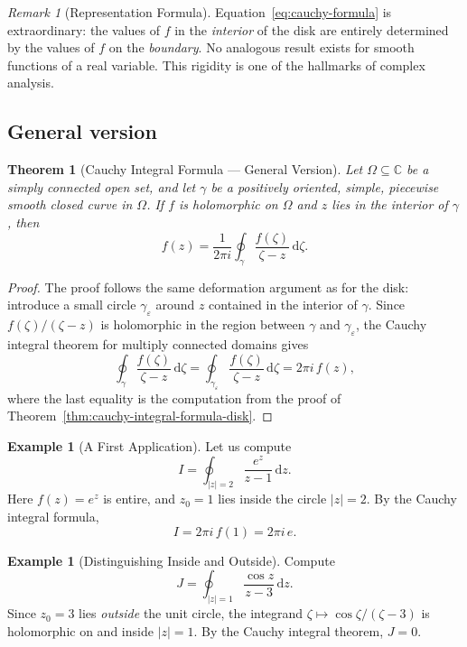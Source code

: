 \documentclass[12pt,a4paper,openany]{book}
\theoremstyle{definition}
\newtheorem{example}[definition]{Example}
\theoremstyle{plain}
\newtheorem{theorem}[definition]{Theorem}
\theoremstyle{remark}
\newtheorem{remark}[definition]{Remark}
\newcommand{\C}{\mathbb{C}}
\newcommand{\dd}{\mathrm{d}}
\newcommand{\abs}[1]{\left|#1\right|}
\begin{document}
\begin{remark}[Representation Formula]\label{rem:representation}
Equation~\eqref{eq:cauchy-formula} is extraordinary: the values of $f$ in the
\emph{interior} of the disk are entirely determined by the values of $f$ on
the \emph{boundary}. No analogous result exists for smooth functions of a real
variable. This rigidity is one of the hallmarks of complex analysis.
\end{remark}

\subsection{General version}

\begin{theorem}[Cauchy Integral Formula --- General Version]\label{thm:cauchy-integral-formula-general}
Let $\Omega\subseteq\C$ be a simply connected open set, and let $\gamma$ be a
positively oriented, simple, piecewise smooth closed curve in $\Omega$. If $f$
is holomorphic on $\Omega$ and $z$ lies in the interior of $\gamma$, then
\[
  f(z) = \frac{1}{2\pi i}\oint_\gamma \frac{f(\zeta)}{\zeta-z}\,\dd\zeta.
\]
\end{theorem}

\begin{proof}
The proof follows the same deformation argument as for the disk: introduce a
small circle $\gamma_\varepsilon$ around $z$ contained in the interior of
$\gamma$. Since $f(\zeta)/(\zeta-z)$ is holomorphic in the region between
$\gamma$ and $\gamma_\varepsilon$, the Cauchy integral theorem for multiply
connected domains gives
\[
  \oint_\gamma \frac{f(\zeta)}{\zeta-z}\,\dd\zeta
  = \oint_{\gamma_\varepsilon}\frac{f(\zeta)}{\zeta-z}\,\dd\zeta
  = 2\pi i\,f(z),
\]
where the last equality is the computation from the proof of
Theorem~\ref{thm:cauchy-integral-formula-disk}.
\end{proof}

\begin{example}[A First Application]\label{ex:cauchy-formula-basic}
Let us compute
\[
  I = \oint_{\abs{z}=2}\frac{e^z}{z-1}\,\dd z.
\]
Here $f(z)=e^z$ is entire, and $z_0=1$ lies inside the circle $\abs{z}=2$. By
the Cauchy integral formula,
\[
  I = 2\pi i\,f(1) = 2\pi i\,e.
\]
\end{example}

\begin{example}[Distinguishing Inside and Outside]\label{ex:cauchy-inside-outside}
Compute
\[
  J = \oint_{\abs{z}=1}\frac{\cos z}{z - 3}\,\dd z.
\]
Since $z_0=3$ lies \emph{outside} the unit circle, the integrand
$\zeta\mapsto\cos\zeta/(\zeta-3)$ is holomorphic on and inside $\abs{z}=1$.
By the Cauchy integral theorem, $J=0$.
\end{example}
\end{document}
